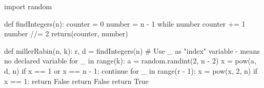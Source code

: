 \documentclass[main.tex]{subfiles}
\begin{document}
\begin{python}
    import random


    def findIntegers(n):
        counter = 0
        number = n - 1
        while number %
            counter += 1
            number //= 2
        return(counter, number)
    
    
    def millerRabin(n, k):
        r, d = findIntegers(n)
        # Use _ as "index" variable - means no declared variable
        for _ in range(k):
            a = random.randint(2, n - 2)
            x = pow(a, d, n)
            if x == 1 or x == n - 1:
                continue
            for _ in range(r - 1):
                x = pow(x, 2, n)
                if x == 1:
                    return False
            return False
        return True    
\end{python}
\end{document}
